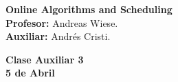 \documentclass[11pt, spanish]{article}
\theoremstyle{plain}
\begin{document}

\begin{flushleft}
  \textbf{Online Algorithms and Scheduling}
  \\\textbf{Profesor:} Andreas Wiese.
  \\\textbf{Auxiliar:} Andrés Cristi.
\end{flushleft}


\begin{center}
  \large{\textbf{Clase Auxiliar 3\\ 5 de Abril }}
\end{center}

\end{document}
